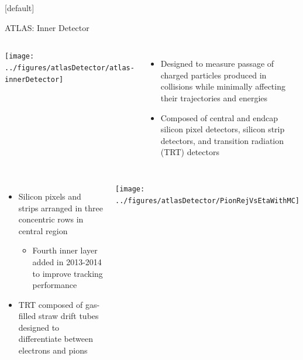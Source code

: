 \documentclass{beamer}
\begin{document}
{  \makeatletter %
  [default]
  \def\beamer@entrycode{\vspace*{-1.075\headheight}}
  \begin{frame}{ATLAS: Inner Detector}
    \begin{columns}
      \texttt{[image: ../figures/atlasDetector/atlas-innerDetector]}
      \begin{itemize}\small
      \item Designed to measure passage of charged particles produced in collisions while minimally affecting their trajectories and energies
      \item Composed of central and endcap silicon pixel detectors, silicon strip detectors, and transition radiation (TRT) detectors
      \end{itemize}  
    \end{columns}
    \begin{columns}
      \begin{itemize}\small
      \item Silicon pixels and strips arranged in three concentric rows in central region
        \begin{itemize}\footnotesize
        \item Fourth inner layer added in 2013-2014 to improve tracking performance
        \end{itemize}
        \vspace{-4pt}
      \item TRT composed of gas-filled straw drift tubes designed to differentiate between electrons and pions
      \end{itemize}  
      \texttt{[image: ../figures/atlasDetector/PionRejVsEtaWithMC]}
    \end{columns}
  \end{frame}

}
\end{document}
